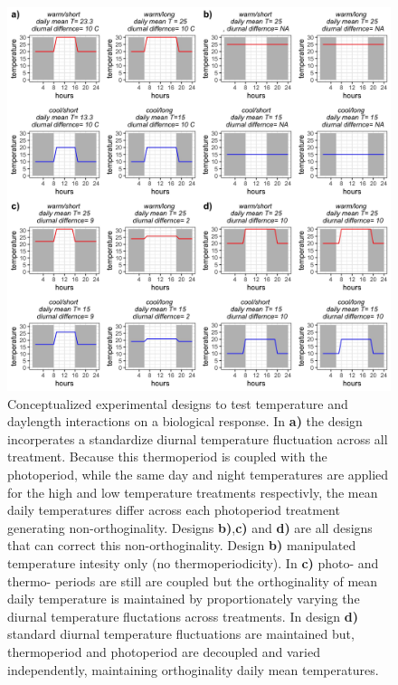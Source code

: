 \documentclass[11pt]{article}
\begin{document}
\begin{figure}[h!]
    \centering
 \includegraphics[width=\textwidth]{..//Plots/periodicity_figures/designs.jpeg}
    \caption{Conceptualized experimental designs to test temperature and daylength interactions on a biological response. In \textbf{a)} the design incorperates a standardize diurnal temperature fluctuation across all treatment. Because this thermoperiod is coupled with the photoperiod, while the same day and night temperatures are applied for the high and low temperature treatments respectivly, the mean daily temperatures differ across each photoperiod treatment generating non-orthoginality. Designs \textbf{b)},\textbf{c)} and \textbf{d)} are all designs that can  correct this non-orthoginality. Design \textbf{b)}  manipulated temperature intesity only (no thermoperiodicity).%
    In  \textbf{c)} photo- and thermo- periods are still are coupled but the orthoginality of mean daily temperature is maintained by proportionately varying the diurnal temperature fluctations across treatments. %
    In design \textbf{d)} standard diurnal temperature fluctuations are maintained but, thermoperiod and photoperiod are decoupled and varied independently, maintaining orthoginality daily mean temperatures.}%
    \label{fig:ortho}
\end{figure}
 
\end{document}
